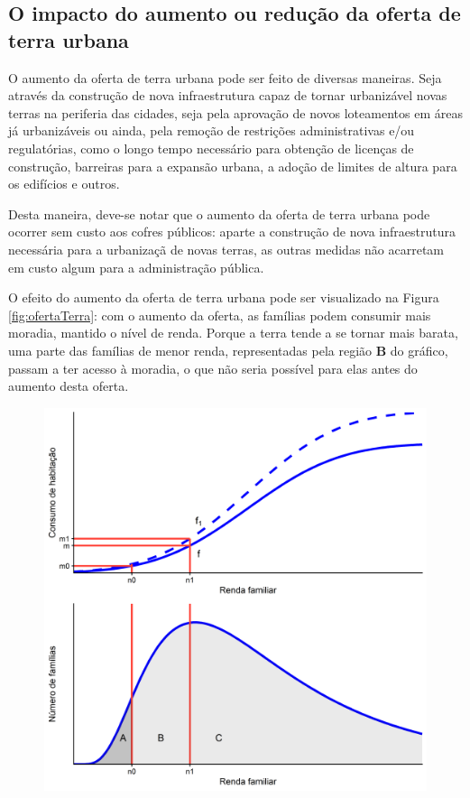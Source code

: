 \documentclass[
	12pt,				%
	oneside,			%
	a4paper,			%
	chapter=TITLE,		%
	section=TITLE,		%
	english,			%
	brazil				%
	]{abntex2}
\begin{document}
\begin{refsection}
\hypertarget{o-impacto-do-aumento-ou-reduuxe7uxe3o-da-oferta-de-terra-urbana}{%
\subsection{O impacto do aumento ou redução da oferta de terra urbana}\label{o-impacto-do-aumento-ou-reduuxe7uxe3o-da-oferta-de-terra-urbana}}

O aumento da oferta de terra urbana pode ser feito de diversas maneiras. Seja
através da construção de nova infraestrutura capaz de tornar urbanizável novas
terras na periferia das cidades, seja pela aprovação de novos loteamentos em
áreas já urbanizáveis ou ainda, pela remoção de restrições administrativas e/ou
regulatórias, como o longo tempo necessário para obtenção de licenças de
construção, barreiras para a expansão urbana, a adoção de limites de altura para
os edifícios e outros.

Desta maneira, deve-se notar que o aumento da oferta de terra urbana pode
ocorrer sem custo aos cofres públicos: aparte a construção de nova
infraestrutura necessária para a urbanizaçã de novas terras, as outras medidas
não acarretam em custo algum para a administração pública.

O efeito do aumento da oferta de terra urbana pode ser visualizado na Figura
\ref{fig:ofertaTerra}: com o aumento da oferta, as famílias podem consumir mais
moradia, mantido o nível de renda. Porque a terra tende a se tornar mais barata,
uma parte das famílias de menor renda, representadas pela região \textbf{B} do
gráfico, passam a ter acesso à moradia, o que não seria possível para elas antes
do aumento desta oferta.
\begin{figure}[H]

{\centering \includegraphics[width=0.7\linewidth]{images/ofertaTerra-1} 

}
\end{figure}
\end{refsection}
\end{document}
